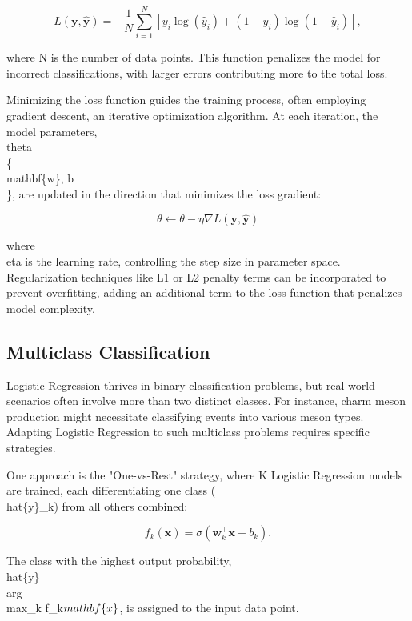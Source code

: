 \begin{equation}
L(\mathbf{y}, \hat{\mathbf{y}}) = -\frac{1}{N} \sum_{i=1}^N \left[ y_i \log(\hat{y}_i) + (1 - y_i) \log(1 - \hat{y}_i) \right],
\end{equation}

where N is the number of data points. This function penalizes the model for incorrect classifications, with larger errors contributing more to the total loss.

Minimizing the loss function guides the training process, often employing gradient descent, an iterative optimization algorithm. At each iteration, the model parameters, \\theta \= \\\{\\mathbf\{w\}, b\\\}, are updated in the direction that minimizes the loss gradient:

\begin{equation}
\theta \leftarrow \theta - \eta \nabla L(\mathbf{y}, \hat{\mathbf{y}})
\end{equation}

where \\eta is the learning rate, controlling the step size in parameter space. Regularization techniques like L1 or L2 penalty terms can be incorporated to prevent overfitting, adding an additional term to the loss function that penalizes model complexity.

\subsection{Multiclass Classification}

Logistic Regression thrives in binary classification problems, but real-world scenarios often involve more than two distinct classes. For instance, charm meson production might necessitate classifying events into various meson types. Adapting Logistic Regression to such multiclass problems requires specific strategies.

One approach is the "One-vs-Rest" strategy, where K Logistic Regression models are trained, each differentiating one class (\\hat\{y\}\_k) from all others combined:

\begin{equation}
f_k(\mathbf{x}) = \sigma(\mathbf{w}_k^\top \mathbf{x} + b_k).
\end{equation}

The class with the highest output probability, \\hat\{y\} \= \\arg\\max\_k f\_k\(\\mathbf\{x\}\), is assigned to the input data point.

